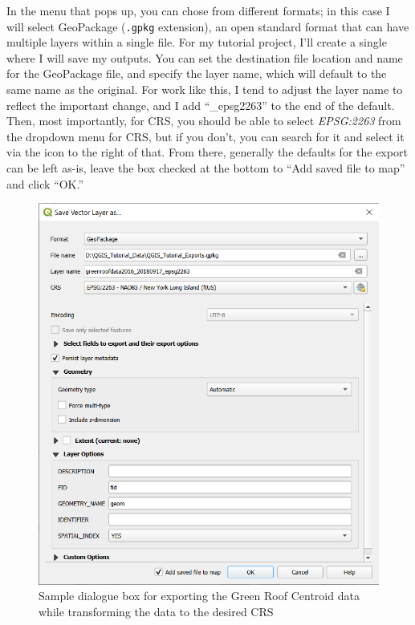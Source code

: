 \documentclass[
  letterpaper,
  DIV=11,
  numbers=noendperiod]{scrreprt}
\begin{document}
In the menu that pops up, you can chose from different formats; in this
case I will select GeoPackage (\texttt{.gpkg} extension), an open
standard format that can have multiple layers within a single file. For
my tutorial project, I'll create a single where I will save my outputs.
You can set the destination file location and name for the GeoPackage
file, and specify the layer name, which will default to the same name as
the original. For work like this, I tend to adjust the layer name to
reflect the important change, and I add ``\_epsg2263'' to the end of the
default. Then, most importantly, for CRS, you should be able to select
\emph{EPSG:2263} from the dropdown menu for CRS, but if you don't, you
can search for it and select it via the
 icon to the
right of that. From there, generally the defaults for the export can be
left as-is, leave the box checked at the bottom to ``Add saved file to
map'' and click ``OK.''

\begin{figure}

{\centering \includegraphics{./images/export_vector_2.png}

}

\caption{Sample dialogue box for exporting the Green Roof Centroid data
while transforming the data to the desired CRS}

\end{figure}
\end{document}
